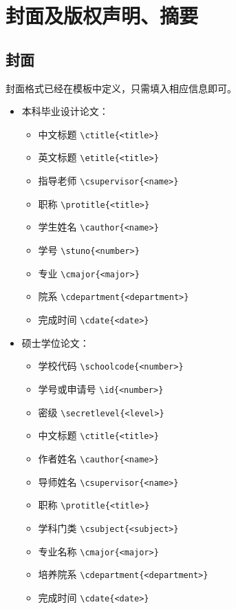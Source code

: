 \section{封面及版权声明、摘要}
\label{sec:cover}

\subsection*{封面}

封面格式已经在模板中定义，只需填入相应信息即可。
\begin{itemize}
\item 本科毕业设计论文：
  \begin{itemize}
    \item 中文标题 \verb|\ctitle{<title>}|
    \item 英文标题 \verb|\etitle{<title>}|
    \item 指导老师 \verb|\csupervisor{<name>}|
    \item 职称 \verb|\protitle{<title>}|
    \item 学生姓名 \verb|\cauthor{<name>}|
    \item 学号 \verb|\stuno{<number>}|
    \item 专业 \verb|\cmajor{<major>}|
    \item 院系 \verb|\cdepartment{<department>}|
    \item 完成时间 \verb|\cdate{<date>}|
  \end{itemize}
\item 硕士学位论文：
  \begin{itemize}
    \item 学校代码 \verb|\schoolcode{<number>}|
    \item 学号或申请号 \verb|\id{<number>}|
    \item 密级 \verb|\secretlevel{<level>}|
    \item 中文标题 \verb|\ctitle{<title>}|
    \item 作者姓名 \verb|\cauthor{<name>}|
    \item 导师姓名 \verb|\csupervisor{<name>}|
    \item 职称 \verb|\protitle{<title>}|
    \item 学科门类 \verb|\csubject{<subject>}|
    \item 专业名称 \verb|\cmajor{<major>}|
    \item 培养院系 \verb|\cdepartment{<department>}|
    \item 完成时间 \verb|\cdate{<date>}|

\end{itemize}
\end{itemize}
